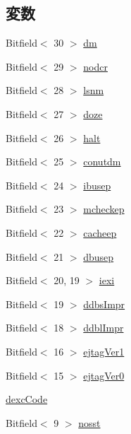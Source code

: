 \subsection*{変数}
\begin{DoxyCompactItemize}
\item 
Bitfield$<$ 30 $>$ \hyperlink{namespaceMipsISA_a2575c29e7f4617b6076486f340b6fe19}{dm}
\item 
Bitfield$<$ 29 $>$ \hyperlink{namespaceMipsISA_a484f38d46faccff72aa369af4c8a086e}{nodcr}
\item 
Bitfield$<$ 28 $>$ \hyperlink{namespaceMipsISA_a43ec93d06a2a972f8174f9ecde90e30f}{lsnm}
\item 
Bitfield$<$ 27 $>$ \hyperlink{namespaceMipsISA_a25c92b67b9c868951dcc1346e05217ec}{doze}
\item 
Bitfield$<$ 26 $>$ \hyperlink{namespaceMipsISA_ad9f2d6a4c2b731f40aee4c97ef34dae2}{halt}
\item 
Bitfield$<$ 25 $>$ \hyperlink{namespaceMipsISA_a140c882200add713056d43320ae90ee7}{conutdm}
\item 
Bitfield$<$ 24 $>$ \hyperlink{namespaceMipsISA_ad1bd3d648866553f25f2ae129bb99f9e}{ibusep}
\item 
Bitfield$<$ 23 $>$ \hyperlink{namespaceMipsISA_a572d975ede660ebdf7718dcd5d05f6f4}{mcheckep}
\item 
Bitfield$<$ 22 $>$ \hyperlink{namespaceMipsISA_a297386c6b4091f227ba72fe86f438239}{cacheep}
\item 
Bitfield$<$ 21 $>$ \hyperlink{namespaceMipsISA_a232e039d9180cd3e75fb2eda2d0d1acb}{dbusep}
\item 
Bitfield$<$ 20, 19 $>$ \hyperlink{namespaceMipsISA_abe7a98fe9301fe8d59a3e645dfee043a}{iexi}
\item 
Bitfield$<$ 19 $>$ \hyperlink{namespaceMipsISA_a13a5d4103bddb375a0f242663295afae}{ddbsImpr}
\item 
Bitfield$<$ 18 $>$ \hyperlink{namespaceMipsISA_a7a90fa9c7206b92777493c9721c94afc}{ddblImpr}
\item 
Bitfield$<$ 16 $>$ \hyperlink{namespaceMipsISA_a2b92945dcf4bc82c985fa2531c7f3cdb}{ejtagVer1}
\item 
Bitfield$<$ 15 $>$ \hyperlink{namespaceMipsISA_a547268003f35ff887729001fd3303733}{ejtagVer0}
\item 
\hyperlink{namespaceMipsISA_ae9fba86af554b856990c68681e8cbdfd}{dexcCode}
\item 
Bitfield$<$ 9 $>$ \hyperlink{namespaceMipsISA_acf601f49a9be58c895649c74d23ee070}{nosst}
\item 

\end{DoxyCompactItemize}
